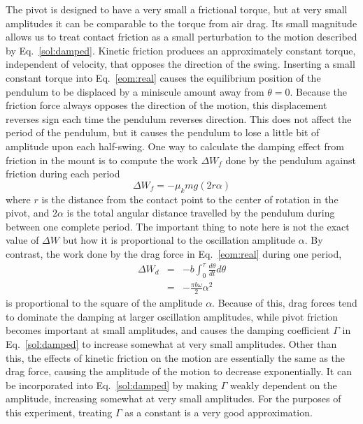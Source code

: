 \documentclass{revtex4}
\begin{document}
The pivot is designed to have a very small a frictional torque, but at very
small amplitudes it can be comparable to the torque from air drag.  Its
small magnitude allows us to treat contact friction as a small perturbation
to the motion described by Eq.~\ref{sol:damped}.  Kinetic friction produces
an approximately constant torque, independent of velocity, that opposes the
direction of the swing.  Inserting a small constant torque into
Eq.~\ref{eom:real} causes the equilibrium position of the pendulum to be
displaced by a miniscule amount away from $\theta=0$.  Because the friction
force always opposes the direction of the motion, this displacement reverses
sign each time the pendulum reverses direction.  This does not affect the
period of the pendulum, but it causes the pendulum to lose a little bit of
amplitude upon each half-swing.  One way to calculate the damping effect
from friction in the mount is to compute the work $\Delta W_f$ done by the
pendulum against friction during each period
\begin{equation}
\Delta W_f = -\mu_k m g (2r\alpha)
\label{eq:workf}
\end{equation}
where $r$ is the distance from the contact point to the center of rotation
in the pivot, and $2\alpha$ is the total angular distance travelled by the
pendulum during between one complete period.  The important thing to 
note here is not the exact value of $\Delta W$ but how it is proportional
to the oscillation amplitude $\alpha$.  By contrast, the work done by the
drag force in Eq.~\ref{eom:real} during one period,
\begin{eqnarray}
\Delta W_d &=& -b\int_0^{\tau}{\frac{d\theta}{dt}d\theta} \nonumber \\
&=& -\frac{\pi b \omega}{2} \alpha^2
\label{eq:workd}
\end{eqnarray}
is proportional to the square of the amplitude $\alpha$.  Because of this,
drag forces tend to dominate the damping at larger oscillation amplitudes,
while pivot friction becomes important at small amplitudes, and causes the
damping coefficient $\Gamma$ in Eq.~\ref{sol:damped} to increase somewhat
at very small amplitudes.  Other than this, the effects of kinetic friction
on the motion are essentially the same as the drag force, causing the
amplitude of the motion to decrease exponentially.  It can be 
incorporated into Eq.~\ref{sol:damped} by making $\Gamma$ weakly dependent
on the amplitude, increasing somewhat at very small amplitudes.  For the
purposes of this experiment, treating $\Gamma$ as a constant is a very good
approximation.
\end{document}
